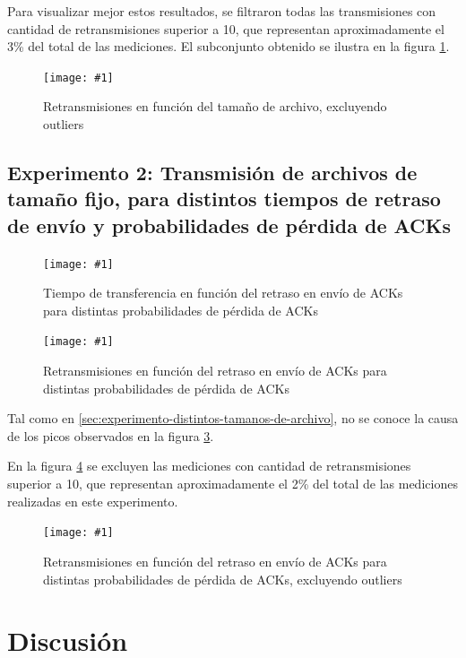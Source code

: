 \documentclass[a4paper, 10pt, twoside]{article}
\newcommand{\grafico}[3]{
  \begin{figure}[H]
    \texttt{[image: \#1]}
    \caption{#2}
    \label{#3}
  \end{figure}
}
\begin{document}
Para visualizar mejor estos resultados, se filtraron todas las transmisiones con cantidad de retransmisiones superior a 10, que representan aproximadamente el 3\% del total de las mediciones. El subconjunto obtenido se ilustra en la figura \ref{plot:retransmissions_vs_size_wo_outliers}.

\grafico{retransmissions_vs_size_wo_outliers}
        {Retransmisiones en función del tamaño de archivo, excluyendo outliers}
        {plot:retransmissions_vs_size_wo_outliers}


\subsection{Experimento 2: Transmisión de archivos de tamaño fijo, para distintos tiempos de retraso de envío y probabilidades de pérdida de ACKs}

\grafico{time_vs_delay_and_loss_probability}
        {Tiempo de transferencia en función del retraso en envío de ACKs para distintas probabilidades de pérdida de ACKs}
        {plot:time_vs_delay_and_loss_probability}

\grafico{retransmissions_vs_delay_and_loss_probability}
        {Retransmisiones en función del retraso en envío de ACKs para distintas probabilidades de pérdida de ACKs}
        {plot:retransmissions_vs_delay_and_loss_probability}

Tal como en \ref{sec:experimento-distintos-tamanos-de-archivo}, no se conoce la causa de los picos observados en la figura \ref{plot:retransmissions_vs_delay_and_loss_probability}.

En la figura \ref{plot:retransmissions_vs_delay_and_loss_probability_wo_outliers} se excluyen las mediciones con cantidad de retransmisiones superior a 10, que representan aproximadamente el 2\% del total de las mediciones realizadas en este experimento.

\grafico{retransmissions_vs_delay_and_loss_probability_wo_outliers}
        {Retransmisiones en función del retraso en envío de ACKs para distintas probabilidades de pérdida de ACKs, excluyendo outliers}
        {plot:retransmissions_vs_delay_and_loss_probability_wo_outliers}




\section{Discusión}
\label{sec:discusion}
\end{document}
